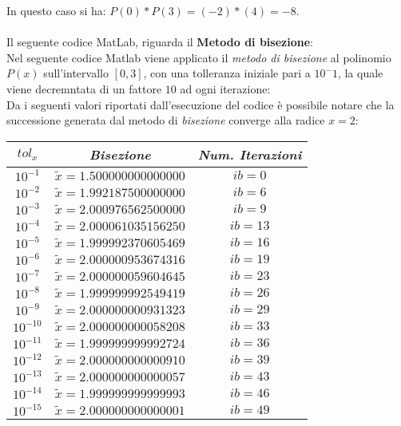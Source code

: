 In questo caso si ha: $P(0)*P(3) = (-2)*(4) = -8$.\\\\
Il seguente codice MatLab, riguarda il \textbf{Metodo di bisezione}:\\
	
Nel seguente codice Matlab viene applicato il \textit{metodo di bisezione} al polinomio $P(x)$ sull'intervallo $[0,3]$, con una tolleranza iniziale pari a $10^-1$, la quale viene decremntata di un fattore $10$ ad ogni iterazione:\\
	
Da i seguenti valori riportati dall'esecuzione del codice è possibile notare che la successione generata dal metodo di \textit{bisezione} converge alla radice $x = 2$:\\
\begin{center}
	\begin{tabular}{|c|c|c|}
		\hline
			$tol_x$ & \textit{Bisezione} & \textit{Num. Iterazioni} \\
		\hline
   			$10^{-1}$ & $\tilde{x} = 1.500000000000000$ & $ib = 0$\\
    		$10^{-2}$ & $\tilde{x} = 1.992187500000000$ & $ib = 6$\\
    		$10^{-3}$ & $\tilde{x} = 2.000976562500000$ & $ib = 9$\\
    		$10^{-4}$ & $\tilde{x} = 2.000061035156250$ & $ib = 13$\\
   			$10^{-5}$ & $\tilde{x} = 1.999992370605469$ & $ib = 16$\\
   			$10^{-6}$ & $\tilde{x} = 2.000000953674316$ & $ib = 19$\\
    		$10^{-7}$ & $\tilde{x} = 2.000000059604645$ & $ib = 23$\\
    		$10^{-8}$ & $\tilde{x} = 1.999999992549419$ & $ib = 26$\\
    		$10^{-9}$ & $\tilde{x} = 2.000000000931323$ & $ib= 29$\\
    		$10^{-10}$ & $\tilde{x} = 2.000000000058208$ & $ib = 33$\\
    		$10^{-11}$ & $\tilde{x} = 1.999999999992724$ & $ib = 36$\\
    		$10^{-12}$ & $\tilde{x} = 2.000000000000910$ & $ib = 39$\\
    		$10^{-13}$ & $\tilde{x} = 2.000000000000057$ & $ib = 43$\\
    		$10^{-14}$ & $\tilde{x} = 1.999999999999993$ & $ib = 46$\\
    		$10^{-15}$ & $\tilde{x} = 2.000000000000001$ & $ib = 49$\\
		\hline
	\end{tabular}
\end{center}